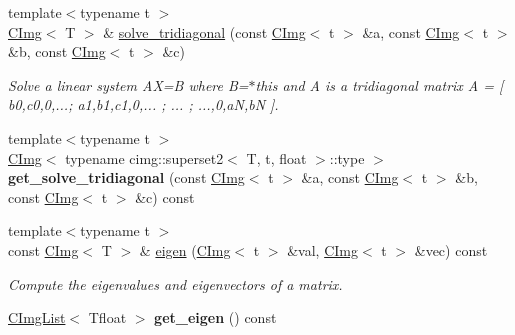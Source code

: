 \begin{DoxyCompactItemize}
\item 
\hypertarget{structcimg__library_1_1CImg_a2c1c7ca0a47cced1f705ee58c3d37a3e}{
{\footnotesize template$<$typename t $>$ }\\\hyperlink{structcimg__library_1_1CImg}{CImg}$<$ T $>$ \& \hyperlink{structcimg__library_1_1CImg_a2c1c7ca0a47cced1f705ee58c3d37a3e}{solve\_\-tridiagonal} (const \hyperlink{structcimg__library_1_1CImg}{CImg}$<$ t $>$ \&a, const \hyperlink{structcimg__library_1_1CImg}{CImg}$<$ t $>$ \&b, const \hyperlink{structcimg__library_1_1CImg}{CImg}$<$ t $>$ \&c)}
\label{structcimg__library_1_1CImg_a2c1c7ca0a47cced1f705ee58c3d37a3e}

\begin{DoxyCompactList}\small\item\em Solve a linear system AX=B where B=$\ast$this and A is a tridiagonal matrix A = \mbox{[} b0,c0,0,...; a1,b1,c1,0,... ; ... ; ...,0,aN,bN \mbox{]}. \item\end{DoxyCompactList}\item 
\hypertarget{structcimg__library_1_1CImg_a2435f8a6d537c2434e2c540d76e7333c}{
{\footnotesize template$<$typename t $>$ }\\\hyperlink{structcimg__library_1_1CImg}{CImg}$<$ typename cimg::superset2$<$ T, t, float $>$::type $>$ {\bfseries get\_\-solve\_\-tridiagonal} (const \hyperlink{structcimg__library_1_1CImg}{CImg}$<$ t $>$ \&a, const \hyperlink{structcimg__library_1_1CImg}{CImg}$<$ t $>$ \&b, const \hyperlink{structcimg__library_1_1CImg}{CImg}$<$ t $>$ \&c) const }
\label{structcimg__library_1_1CImg_a2435f8a6d537c2434e2c540d76e7333c}

\item 
\hypertarget{structcimg__library_1_1CImg_aa956e08285c0d87805d3c3c2c4450301}{
{\footnotesize template$<$typename t $>$ }\\const \hyperlink{structcimg__library_1_1CImg}{CImg}$<$ T $>$ \& \hyperlink{structcimg__library_1_1CImg_aa956e08285c0d87805d3c3c2c4450301}{eigen} (\hyperlink{structcimg__library_1_1CImg}{CImg}$<$ t $>$ \&val, \hyperlink{structcimg__library_1_1CImg}{CImg}$<$ t $>$ \&vec) const }
\label{structcimg__library_1_1CImg_aa956e08285c0d87805d3c3c2c4450301}

\begin{DoxyCompactList}\small\item\em Compute the eigenvalues and eigenvectors of a matrix. \item\end{DoxyCompactList}\item 
\hypertarget{structcimg__library_1_1CImg_a4594e576d73d47bd3557c2db395c44df}{
\hyperlink{structcimg__library_1_1CImgList}{CImgList}$<$ Tfloat $>$ {\bfseries get\_\-eigen} () const }
\label{structcimg__library_1_1CImg_a4594e576d73d47bd3557c2db395c44df}


\end{DoxyCompactItemize}
